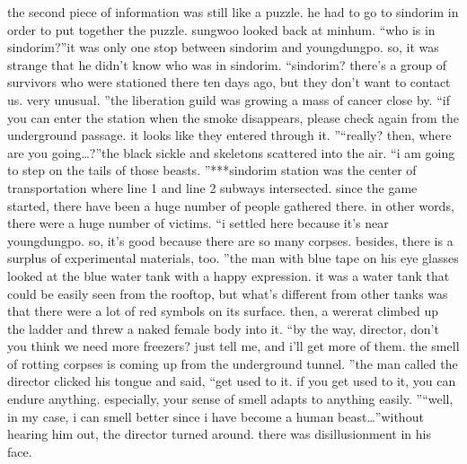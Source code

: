 the second piece of information was still like a puzzle.
 he had to go to sindorim in order to put together the puzzle.
sungwoo looked back at minhum.
“who is in sindorim?”it was only one stop between sindorim and youngdungpo.
 so, it was strange that he didn’t know who was in sindorim.
“sindorim? there’s a group of survivors who were stationed there ten days ago, but they don’t want to contact us.
 very unusual.
”the liberation guild was growing a mass of cancer close by.
“if you can enter the station when the smoke disappears, please check again from the underground passage.
 it looks like they entered through it.
”“really? then, where are you going…?”the black sickle and skeletons scattered into the air.
“i am going to step on the tails of those beasts.
”***sindorim station was the center of transportation where line 1 and line 2 subways intersected.
 since the game started, there have been a huge number of people gathered there.
in other words, there were a huge number of victims.
“i settled here because it’s near youngdungpo.
 so, it’s good because there are so many corpses.
 besides, there is a surplus of experimental materials, too.
”the man with blue tape on his eye glasses looked at the blue water tank with a happy expression.
 it was a water tank that could be easily seen from the rooftop, but what’s different from other tanks was that there were a lot of red symbols on its surface.
 then, a wererat climbed up the ladder and threw a naked female body into it.
“by the way, director, don’t you think we need more freezers? just tell me, and i’ll get more of them.
 the smell of rotting corpses is coming up from the underground tunnel.
”the man called the director clicked his tongue and said, “get used to it.
 if you get used to it, you can endure anything.
 especially, your sense of smell adapts to anything easily.
”“well, in my case, i can smell better since i have become a human beast…”without hearing him out, the director turned around.
 there was disillusionment in his face.


 